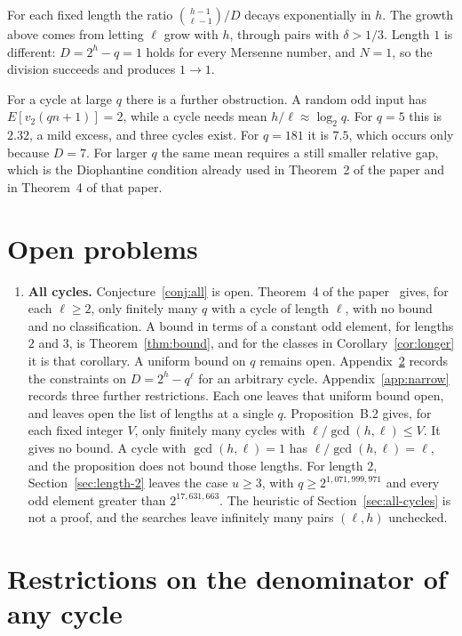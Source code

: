 \documentclass[11pt]{article}
\begin{document}
For each fixed length the ratio $\binom{h-1}{\ell-1}/D$ decays exponentially in $h$.
The growth above comes from letting $\ell$ grow with $h$, through pairs with $\delta > 1/3$.
Length $1$ is different: $D = 2^h - q = 1$ holds for every Mersenne number, and $N = 1$, so the division succeeds and produces $1 \to 1$.

For a cycle at large $q$ there is a further obstruction.
A random odd input has $E[v_2(qn+1)] = 2$, while a cycle needs mean $h/\ell \approx \log_2 q$.
For $q = 5$ this is $2.32$, a mild excess, and three cycles exist.
For $q = 181$ it is $7.5$, which occurs only because $D = 7$.
For larger $q$ the same mean requires a still smaller relative gap, which is the Diophantine condition already used in Theorem~2 of the paper and in Theorem~4 of that paper.

\section{Open problems}
\label{sec:open}

\begin{enumerate}
\item \textbf{All cycles.}
Conjecture~\ref{conj:all} is open.
Theorem~4 of the paper~\cite{hackman-i} gives, for each $\ell \ge 2$, only finitely many $q$ with a cycle of length $\ell$, with no bound and no classification.
A bound in terms of a constant odd element, for lengths $2$ and $3$, is Theorem~\ref{thm:bound}, and for the classes in Corollary~\ref{cor:longer} it is that corollary.
A uniform bound on $q$ remains open.
Appendix~\ref{app:denominator} records the constraints on $D = 2^h - q^\ell$ for an arbitrary cycle.
Appendix~\ref{app:narrow} records three further restrictions.
Each one leaves that uniform bound open, and leaves open the list of lengths at a single $q$.
Proposition~B.2 gives, for each fixed integer $V$, only finitely many cycles with $\ell/\gcd(h,\ell) \le V$.
It gives no bound.
A cycle with $\gcd(h,\ell) = 1$ has $\ell/\gcd(h,\ell) = \ell$, and the proposition does not bound those lengths.
For length $2$, Section~\ref{sec:length-2} leaves the case $u \ge 3$, with $q \ge 2^{1{,}071{,}999{,}971}$ and every odd element greater than $2^{17{,}631{,}663}$.
The heuristic of Section~\ref{sec:all-cycles} is not a proof, and the searches leave infinitely many pairs $(\ell, h)$ unchecked.
\end{enumerate}

\appendix

\section{Restrictions on the denominator of any cycle}
\label{app:denominator}
\end{document}
